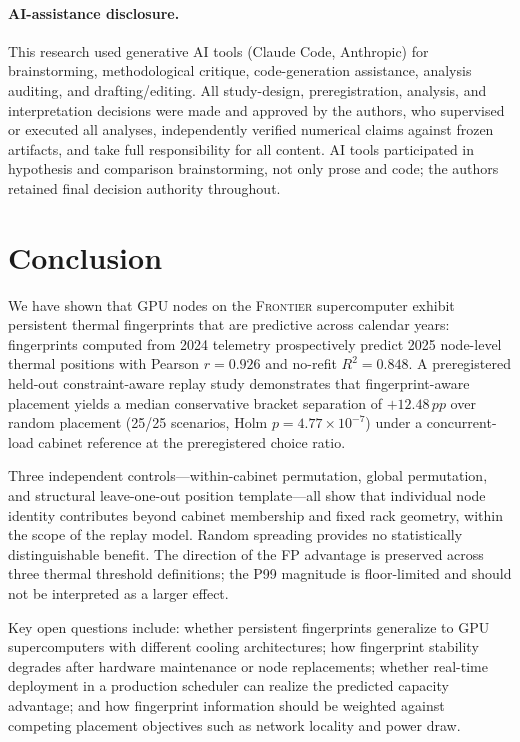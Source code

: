 \documentclass[acmsmall,screen,review,anonymous]{acmart}
\newcommand{\Frontier}{\textsc{Frontier}\xspace}
\newcommand{\pp}{\,pp\xspace}
\begin{document}
\paragraph{AI-assistance disclosure.}
This research used generative AI tools (Claude Code, Anthropic) for brainstorming,
methodological critique, code-generation assistance, analysis auditing, and
drafting/editing.  All study-design, preregistration, analysis, and interpretation
decisions were made and approved by the authors, who supervised or executed all
analyses, independently verified numerical claims against frozen artifacts, and
take full responsibility for all content.  AI tools participated in hypothesis and
comparison brainstorming, not only prose and code; the authors retained final
decision authority throughout.

\section{Conclusion}
\label{sec:conclusion}

We have shown that GPU nodes on the \Frontier supercomputer exhibit persistent thermal
fingerprints that are predictive across calendar years: fingerprints computed from 2024
telemetry prospectively predict 2025 node-level thermal positions with Pearson $r = 0.926$
and no-refit $R^2 = 0.848$.  A preregistered held-out constraint-aware replay study
demonstrates that fingerprint-aware placement yields a median conservative bracket
separation of $+12.48\pp$ over random placement (25/25 scenarios, Holm $p = 4.77\times10^{-7}$)
under a concurrent-load cabinet reference at the preregistered choice ratio.

Three independent controls---within-cabinet permutation, global permutation, and
structural leave-one-out position template---all show that individual node identity
contributes beyond cabinet membership and fixed rack geometry, within the scope of the
replay model.  Random spreading provides no statistically distinguishable benefit.
The direction of the FP advantage is preserved across three thermal threshold definitions;
the P99 magnitude is floor-limited and should not be interpreted as a larger effect.

Key open questions include: whether persistent fingerprints generalize to GPU
supercomputers with different cooling architectures; how fingerprint stability degrades
after hardware maintenance or node replacements; whether real-time deployment in a
production scheduler can realize the predicted capacity advantage; and how fingerprint
information should be weighted against competing placement objectives such as network
locality and power draw.
\end{document}
